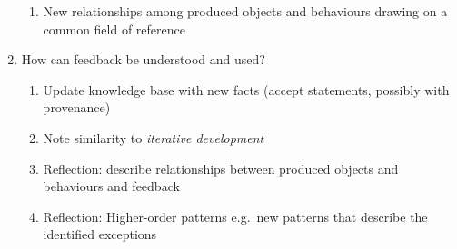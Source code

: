 \begin{enumerate}[start=2]
\begin{enumerate}
\item New relationships among produced objects and behaviours drawing
  on a common field of reference
\end{enumerate}
\item[] How can feedback be understood and used? 
\begin{enumerate}
\item Update knowledge base with new facts (accept statements,
  possibly with provenance)
\item Note similarity to \emph{iterative development}
\item Reflection: describe relationships between produced objects and
  behaviours and feedback
\item Reflection: Higher-order patterns e.g.~new patterns that
  describe the identified exceptions
\end{enumerate}
\end{enumerate}

